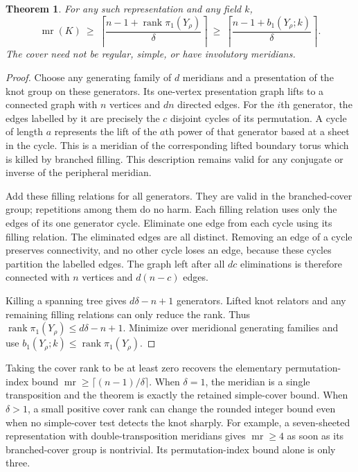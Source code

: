 \documentclass[11pt]{article}
\newtheorem{theorem}{Theorem}
\newcommand{\mr}{\operatorname{mr}}
\newcommand{\rank}{\operatorname{rank}}
\begin{document}
\begin{theorem}\label{thm:general}
For any such representation and any field $k$,
\[
 \mr(K)\ \ge\
 \left\lceil\frac{n-1+\rank\pi_1(Y_\rho)}{\delta}\right\rceil
 \ \ge\
 \left\lceil\frac{n-1+b_1(Y_\rho;k)}{\delta}\right\rceil.
\]
The cover need not be regular, simple, or have involutory meridians.
\end{theorem}
\begin{proof}
Choose any generating family of $d$ meridians and a presentation of the
knot group on these generators. Its one-vertex presentation graph lifts
to a connected graph with $n$ vertices and $dn$ directed edges.
For the $i$th generator, the edges labelled by it are precisely the
$c$ disjoint cycles of its permutation. A cycle of length $a$ represents
the lift of the $a$th power of that generator based at a sheet in the
cycle. This is a meridian of the corresponding lifted boundary torus
which is killed by branched filling. This description remains valid for
any conjugate or inverse of the peripheral meridian.

Add these filling relations for all generators. They are valid in the
branched-cover group; repetitions among them do no harm. Each filling
relation uses only the edges of its one generator cycle. Eliminate one
edge from each cycle using its filling relation. The eliminated edges
are all distinct. Removing an edge of a cycle preserves connectivity,
and no other cycle loses an edge, because these cycles partition the
labelled edges. The graph left after all $dc$ eliminations is therefore
connected with $n$ vertices and $d(n-c)$ edges.

Killing a spanning tree gives $d\delta-n+1$ generators. Lifted knot
relators and any remaining filling relations can only reduce the rank.
Thus $\rank\pi_1(Y_\rho)\le d\delta-n+1$. Minimize over meridional
generating families and use $b_1(Y_\rho;k)\le\rank\pi_1(Y_\rho)$.
\end{proof}

Taking the cover rank to be at least zero recovers the elementary
permutation-index bound $\mr\ge\lceil(n-1)/\delta\rceil$.
When $\delta=1$, the meridian is a single transposition and the theorem
is exactly the retained simple-cover bound.
When $\delta>1$, a small positive cover rank can change the rounded
integer bound even when no simple-cover test detects the knot sharply.
For example, a seven-sheeted representation with double-transposition
meridians gives $\mr\ge4$ as soon as its branched-cover group is
nontrivial. Its permutation-index bound alone is only three.
\end{document}
